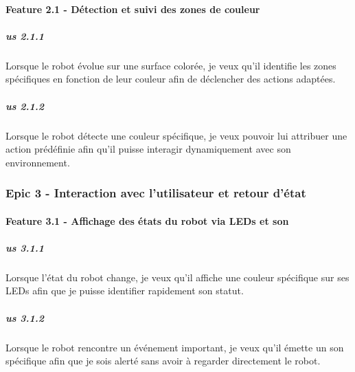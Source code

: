 \paragraph{Feature 2.1 - Détection et suivi des zones de couleur}
\subparagraph{\acrshort{us} 2.1.1} Lorsque le robot évolue sur une surface colorée, je veux qu’il identifie les zones spécifiques en fonction de leur couleur afin de déclencher des actions adaptées.
\subparagraph{\acrshort{us} 2.1.2} Lorsque le robot détecte une couleur spécifique, je veux pouvoir lui attribuer une action prédéfinie afin qu’il puisse interagir dynamiquement avec son environnement.

\subsubsection{Epic 3 - Interaction avec l’utilisateur et retour d’état}

\paragraph{Feature 3.1 - Affichage des états du robot via LEDs et son}
\subparagraph{\acrshort{us} 3.1.1} Lorsque l’état du robot change, je veux qu’il affiche une couleur spécifique sur ses LEDs afin que je puisse identifier rapidement son statut.
\subparagraph{\acrshort{us} 3.1.2} Lorsque le robot rencontre un événement important, je veux qu’il émette un son spécifique afin que je sois alerté sans avoir à regarder directement le robot.


